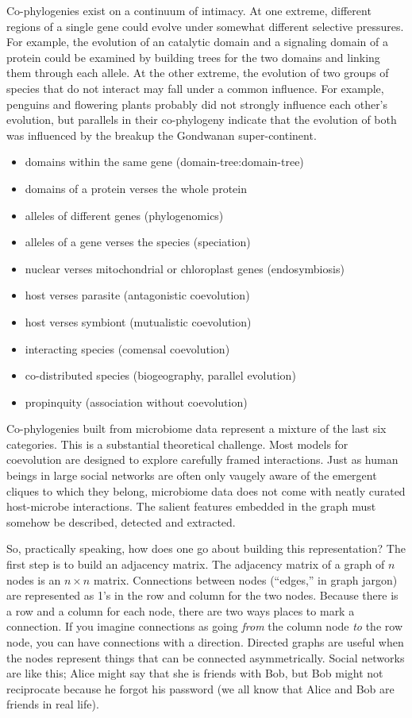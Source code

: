 \documentclass[
10pt, %
a4paper, %
oneside, %
headinclude,footinclude, %
BCOR5mm, %
]{scrartcl}
\begin{document}
Co-phylogenies exist on a continuum of intimacy. At one extreme, different regions of a single gene could evolve under somewhat different selective pressures. For example, the evolution of an catalytic domain and a signaling domain of a protein could be examined by building trees for the two domains and linking them through each allele. At the other extreme, the evolution of two groups of species that do not interact may fall under a common influence. For example, penguins and flowering plants probably did not strongly influence each other's evolution, but parallels in their co-phylogeny indicate that the evolution of both was influenced by the breakup the Gondwanan super-continent. 


\begin{itemize}
\item domains within the same gene (domain-tree:domain-tree)
\item domains of a protein verses the whole protein 
\item alleles of different genes (phylogenomics)
\item alleles of a gene verses the species (speciation)
\item nuclear verses mitochondrial or chloroplast genes (endosymbiosis)
\item host verses parasite (antagonistic coevolution)
\item host verses symbiont (mutualistic coevolution)
\item interacting species (comensal coevolution)
\item co-distributed species (biogeography, parallel evolution)
\item propinquity (association without coevolution)
\end{itemize}


Co-phylogenies built from microbiome data represent a mixture of the last six categories. This is a substantial theoretical challenge. Most models for coevolution are designed to explore carefully framed interactions. Just as human beings in large social networks are often only vaugely aware of the emergent cliques to which they belong, microbiome data does not come with neatly curated host-microbe interactions. The salient features embedded in the graph must somehow be described, detected and extracted.

So, practically speaking, how does one go about building this representation? The first step is to build an adjacency matrix. The adjacency matrix of a graph of $n$ nodes is an $n \times n$ matrix. Connections between nodes (``edges,'' in graph jargon) are represented as 1's in the row and column for the two nodes. Because there is a row and a column for each node, there are two ways places to mark a connection. If you imagine connections as going {\em from} the column node {\em to} the row node, you can have connections with a direction. Directed graphs are useful when the nodes represent things that can be connected asymmetrically. Social networks are like this; Alice might say that she is friends with Bob, but Bob might not reciprocate because he forgot his password (we all know that Alice and Bob are friends in real life). 
\end{document}
